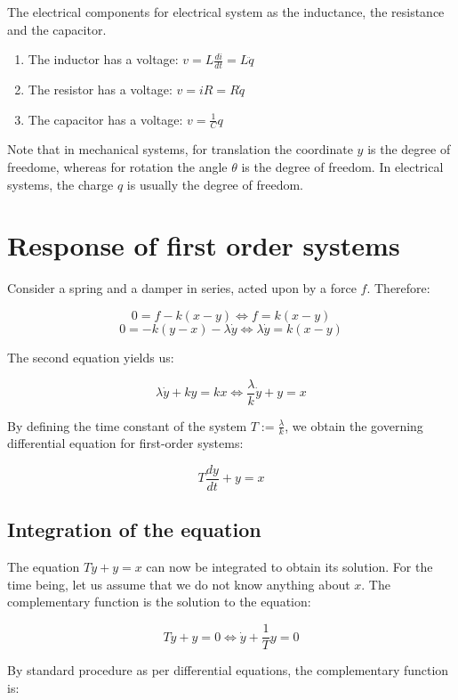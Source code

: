 \documentclass[12pt]{article}
\begin{document}
\begin{proposition}
  The electrical components for electrical system as the inductance, the resistance and the capacitor.
  \begin{enumerate}
    \item The inductor has a voltage: $v = L\frac{di}{dt} = L\ddot{q}$
    \item The resistor has a voltage: $v = iR = R\dot{q}$
    \item The capacitor has a voltage: $v = \frac{1}{C}q$
  \end{enumerate}
\end{proposition}

Note that in mechanical systems, for translation the coordinate $y$ is the degree of freedome, whereas for rotation the angle $\theta$ is the degree of freedom. In electrical systems, the charge $q$ is usually the degree of freedom.

\newpage

\section{Response of first order systems}

Consider a spring and a damper in series, acted upon by a force $f$. Therefore:

\[ 0 = f - k(x - y) \iff f = k(x - y) \]
\[ 0 = -k(y - x) - \lambda\dot{y} \iff \lambda\dot{y} = k(x - y) \]

The second equation yields us:

\[ \lambda\dot{y} + ky = kx\iff \frac{\lambda}{k}\dot{y} + y = x \]

By defining the time constant of the system $T := \frac{\lambda}{k}$, we obtain the governing differential equation for first-order systems:

\[ T\frac{dy}{dt} + y = x \]

\subsection{Integration of the equation}

The equation $T\dot{y} + y = x$ can now be integrated to obtain its solution. For the time being, let us assume that we do not know anything about $x$. The complementary function is the solution to the equation:

\[ T\dot{y} + y = 0 \iff \dot{y} + \frac{1}{T}y = 0 \]

By standard procedure as per differential equations, the complementary function is:
\end{document}
